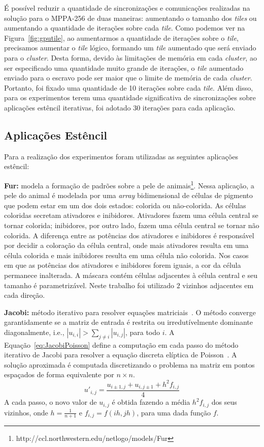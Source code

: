 \documentclass[12pt]{article}
\newcommand{\mppa}{MPPA-256\xspace}
\begin{document}
É possível reduzir a quantidade de sincronizações e comunicações realizadas na
solução para o \mppa de duas maneiras: aumentando o tamanho dos \textit{tiles}
ou aumentando a quantidade de iterações sobre cada \textit{tile}. Como podemos
ver na Figura~\ref{fig:gputile}, ao aumentarmos a quantidade de iterações sobre
o \textit{tile}, precisamos aumentar o \textit{tile} lógico, formando um
\textit{tile} aumentado que será enviado para o \textit{cluster}. Desta forma,
devido às limitações de memória em cada \textit{cluster}, ao ser especificado
uma quantidade muito grande de iterações, o \textit{tile} aumentado enviado para
o escravo pode ser maior que o limite de memória de cada \textit{cluster}.
Portanto, foi fixado uma quantidade de 10 iterações sobre cada \textit{tile}.
Além disso, para os experimentos terem uma quantidade significativa de
sincronizações sobre aplicações estêncil iterativas, foi adotado 30 iterações
para cada aplicação.

\subsection{Aplicações Estêncil}

Para a realização dos experimentos foram utilizadas as seguintes aplicações estêncil:

\textbf{Fur:} modela a formação de padrões sobre a pele de
animais\footnote{{http://ccl.northwestern.edu/netlogo/models/Fur}}. Nessa
aplicação, a pele do animal é modelada por uma \textit{array} bidimensional de
células de pigmento que podem estar em um dos dois estados: colorida ou
não-colorida. As células coloridas secretam ativadores e inibidores. Ativadores
fazem uma célula central se tornar colorida; inibidores, por outro lado, fazem
uma célula central se tornar não colorida.
A diferença entre as potências dos ativadores e inibidores é responsável por
decidir a coloração da célula central, onde mais ativadores resulta em uma
célula colorida e mais inibidores resulta em uma célula não colorida. Nos casos
em que as potências dos ativadores e inibidores forem iguais, a cor da célula
permanece inalterada. A máscara contém células adjacentes à célula central e seu
tamanho é parametrizável. Neste trabalho foi utilizado $2$ vizinhos adjacentes
em cada direção.

\textbf{Jacobi:} método iterativo para resolver equações matriciais~\cite{demmel97}.
O método converge garantidamente se a matriz de entrada é restrita ou irredutívelmente dominante diagonalmente, i.e., $|u_{i,i}| > \sum_{j\neq i}{|u_{i,j}|}$, para todo $i$.
A Equação~\ref{eq:JacobiPoisson} define a computação em cada passo do método
iterativo de Jacobi para resolver a equação discreta elíptica de
Poisson~\cite{demmel97}. A solução aproximada é computada discretizando o
problema na matriz em pontos espaçados de forma equivalente por $n\times n$.\\
 \begin{equation}
 u'_{i,j} = \frac{u_{i\pm1,j} + u_{i,j\pm1} + h^2f_{i,j}}{4}
 \label{eq:JacobiPoisson}
 \end{equation}
 A cada passo, o novo valor de $u_{i,j}$ é obtida fazendo a média $h^2f_{i,j}$ dos seus vizinhos, onde $h = \frac{1}{n+1}$ e $f_{i,j} = f(ih,jh)$,
 para uma dada função $f$.
\end{document}
